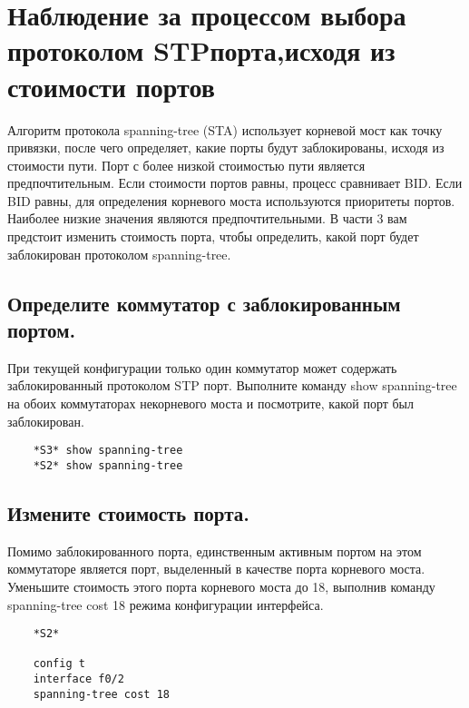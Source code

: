 \section{Наблюдение за процессом выбора протоколом STPпорта,исходя из стоимости портов}
Алгоритм протокола spanning-tree (STA) использует корневой мост как точку привязки, после чего
определяет, какие порты будут заблокированы, исходя из стоимости пути.
Порт с более низкой стоимостью пути является предпочтительным.
Если стоимости портов равны, процесс сравнивает BID\@.
Если BID равны, для определения корневого моста используются приоритеты портов.
Наиболее низкие значения являются предпочтительными.
В части 3 вам предстоит изменить стоимость порта, чтобы определить, какой порт будет заблокирован протоколом
spanning-tree.


\subsection{Определите коммутатор с заблокированным портом.}
При текущей конфигурации только один коммутатор может содержать заблокированный протоколом
STP порт.
Выполните команду show spanning-tree на обоих коммутаторах некорневого моста и посмотрите, какой порт был заблокирован.

\begin{verbatim}
    *S3* show spanning-tree
    *S2* show spanning-tree
\end{verbatim}


\subsection{Измените стоимость порта.}
Помимо заблокированного порта, единственным активным портом на этом коммутаторе является порт,
выделенный в качестве порта корневого моста.
Уменьшите стоимость этого порта корневого моста до 18, выполнив команду spanning-tree cost 18 режима конфигурации
интерфейса.


\begin{verbatim}
    *S2*

    config t
    interface f0/2
    spanning-tree cost 18
\end{verbatim}

